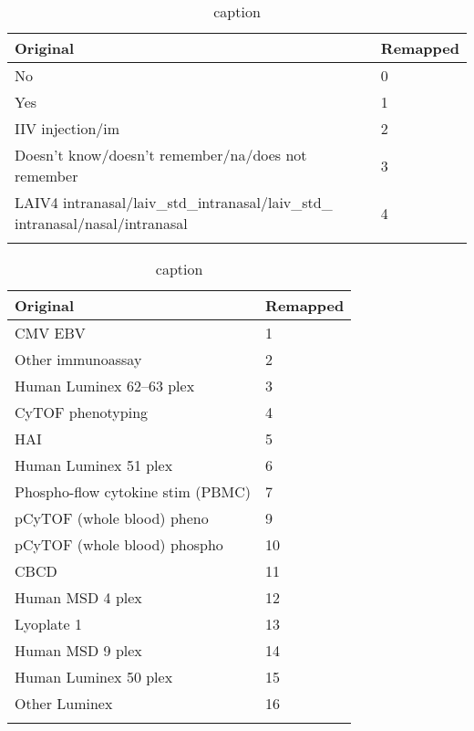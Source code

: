 \begin{appendices}
    \begin{table}[htpb]
        \begin{tabular}{ll}
            \toprule{}
            Original & Remapped \\
            \midrule{}
            No& 0 \\
            Yes& 1 \\
            IIV injection/im& 2 \\
            Doesn’t know/doesn’t remember/na/does not remember& 3 \\
            LAIV4 intranasal/laiv\_std\_intranasal/laiv\_std\_ intranasal/nasal/intranasal& 4 \\
            \bottomrule{}
        \end{tabular}
        \caption{caption}\label{tbl:remapHistory}
    \end{table}

    \begin{table}[htpb]
        \begin{tabular}{ll}
            \toprule{}
            Original & Remapped \\
            \midrule{}
            CMV EBV & 1 \\
            Other immunoassay & 2 \\
            Human Luminex 62–63 plex & 3 \\
            CyTOF phenotyping & 4 \\
            HAI & 5 \\
            Human Luminex 51 plex & 6 \\
            Phospho-flow cytokine stim (PBMC) & 7 \\
            pCyTOF (whole blood) pheno & 9 \\
            pCyTOF (whole blood) phospho & 10 \\
            CBCD & 11 \\
            Human MSD 4 plex & 12 \\
            Lyoplate 1 & 13 \\
            Human MSD 9 plex & 14 \\
            Human Luminex 50 plex & 15 \\
            Other Luminex & 16 \\
            \bottomrule{}
        \end{tabular}
        \caption{caption}\label{tbl:remapAssays}
    \end{table}
\end{appendices}


